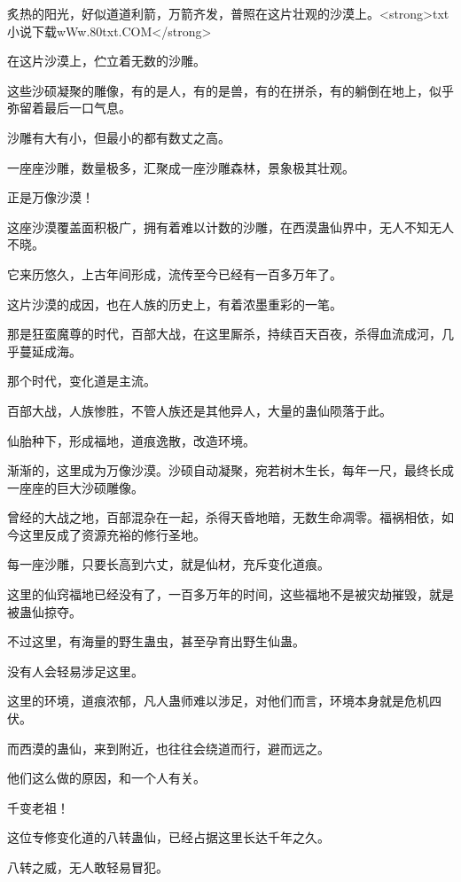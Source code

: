 
\begin{this_body}

炙热的阳光，好似道道利箭，万箭齐发，普照在这片壮观的沙漠上。<strong>txt小说下载wWw.80txt.COM</strong>

在这片沙漠上，伫立着无数的沙雕。

这些沙硕凝聚的雕像，有的是人，有的是兽，有的在拼杀，有的躺倒在地上，似乎弥留着最后一口气息。

沙雕有大有小，但最小的都有数丈之高。

一座座沙雕，数量极多，汇聚成一座沙雕森林，景象极其壮观。

正是万像沙漠！

这座沙漠覆盖面积极广，拥有着难以计数的沙雕，在西漠蛊仙界中，无人不知无人不晓。

它来历悠久，上古年间形成，流传至今已经有一百多万年了。

这片沙漠的成因，也在人族的历史上，有着浓墨重彩的一笔。

那是狂蛮魔尊的时代，百部大战，在这里厮杀，持续百天百夜，杀得血流成河，几乎蔓延成海。

那个时代，变化道是主流。

百部大战，人族惨胜，不管人族还是其他异人，大量的蛊仙陨落于此。

仙胎种下，形成福地，道痕逸散，改造环境。

渐渐的，这里成为万像沙漠。沙硕自动凝聚，宛若树木生长，每年一尺，最终长成一座座的巨大沙硕雕像。

曾经的大战之地，百部混杂在一起，杀得天昏地暗，无数生命凋零。福祸相依，如今这里反成了资源充裕的修行圣地。

每一座沙雕，只要长高到六丈，就是仙材，充斥变化道痕。

这里的仙窍福地已经没有了，一百多万年的时间，这些福地不是被灾劫摧毁，就是被蛊仙掠夺。

不过这里，有海量的野生蛊虫，甚至孕育出野生仙蛊。

没有人会轻易涉足这里。

这里的环境，道痕浓郁，凡人蛊师难以涉足，对他们而言，环境本身就是危机四伏。

而西漠的蛊仙，来到附近，也往往会绕道而行，避而远之。

他们这么做的原因，和一个人有关。

千变老祖！

这位专修变化道的八转蛊仙，已经占据这里长达千年之久。

八转之威，无人敢轻易冒犯。


\end{this_body}
